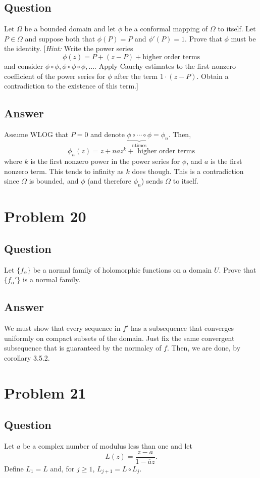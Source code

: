\documentclass[11pt]{article}
\begin{document}
\subsection{Question}
Let $\Omega$ be a bounded domain and let $\phi$ be a conformal mapping of $\Omega$ to itself. Let $P \in \Omega$ and suppose both that $\phi(P) =P$ and $\phi'(P)=1$. Prove that $\phi$ must be the identity. [\emph{Hint: } Write the power series 
\[\phi(z) = P+(z-P)+ \mbox{higher order terms}\]
and consider $\phi \circ \phi, \phi \circ \phi \circ \phi, \dots$. Apply Cauchy estimates to the first nonzero coefficient of the power series for $\phi$ after the term $1 \cdot (z- P)$. Obtain a contradiction to the existence of this term.]
\subsection{Answer}
Assume WLOG that $P=0$ and denote $\underbrace{ \phi \circ \cdots \circ \phi}_\mathrm{n times} =\phi_n$. Then, 
\[\phi_n(z) = z + n  a z^k  + \mbox{ higher order terms}\]
where $k$ is the first nonzero power in the power series for $\phi$, and $a$ is the first nonzero term. This tends to infinity as $k$ does though. This is a contradiction since $\Omega$ is bounded, and $\phi$ (and therefore $\phi_n$) sends $\Omega $ to itself.

\section{Problem 20}
\subsection{Question}
Let $\{f_\alpha\}$ be a normal family of holomorphic functions on a domain $U$. Prove that $\{f_\alpha' \}$ is a normal family.
\subsection{Answer}
We must show that every sequence  in $f'$ has a subsequence that converges uniformly on compact subsets of the domain. Just fix the same convergent subsequence that is guaranteed by the normalcy of $f$. Then,  we are done, by corollary 3.5.2.
\section{Problem 21}
\subsection{Question}
Let $a$ be a complex number of modulus less than one and let 
\[ L(z) = \frac{z-a}{1-\overline{a} z} .\]
Define $L_1 = L$ and, for $j \geq 1$, $L _{j+1} = L \circ L_j$.
\end{document}
